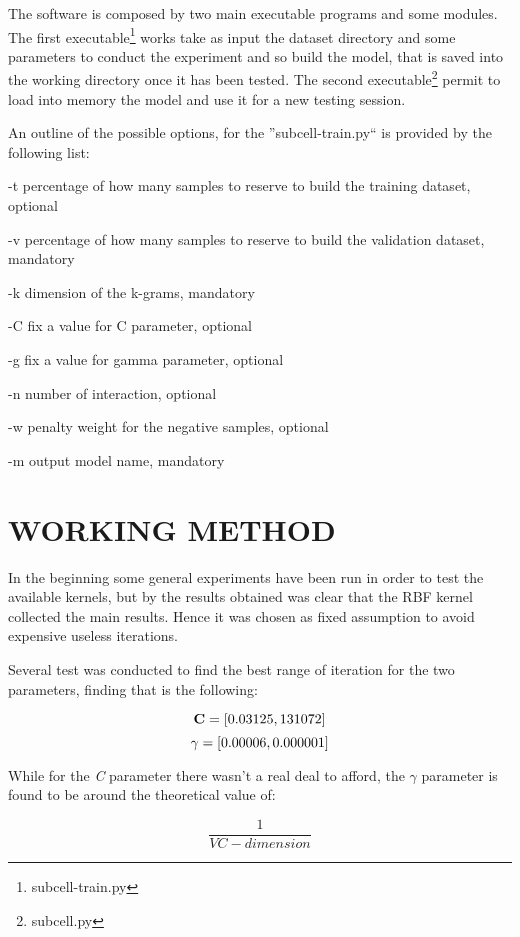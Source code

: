 \documentclass{acm_proc_article-sp-sigmod07}
\begin{document}
The software is composed by two main executable programs and some modules.
The first executable\footnote{subcell-train.py}
works take as input the dataset directory and some parameters 
to conduct the experiment and so build the model, that is saved into the working 
directory once it has been tested. The second executable\footnote{subcell.py}
permit to load into memory the model and use it for a new testing session.

An outline of the possible options, for the ''subcell-train.py`` 
is provided by the following list:
\begin{description}
\item{-t} percentage of how many samples to reserve to build the training dataset, 
optional 
\item{-v} percentage of how many samples to reserve to build the validation dataset, 
mandatory
\item{-k} dimension of the k-grams, mandatory
\item{-C} fix a value for C parameter, optional
\item{-g} fix a value for gamma parameter, optional
\item{-n} number of interaction, optional
\item{-w} penalty weight for the negative samples, optional
\item{-m} output model name, mandatory
\end{description}


\section{WORKING METHOD}
In the beginning some general experiments have been run in order to test the
available kernels, but by the results obtained was clear that the RBF kernel
collected the main results. Hence it was chosen as fixed assumption to avoid
expensive useless iterations.

Several test was conducted to find the best range of iteration for the two
parameters, finding that is the following:

$$
	\bold{C} = [0.03125, 131072]
$$
$$
 	\bold{\gamma} = [0.00006, 0.000001]
$$

While for the \emph{C} parameter there wasn't a real deal to afford, the 
$ \gamma $ parameter is found to be around the theoretical value of:

\begin{equation}
\frac{1}{VC-dimension}
\label{gamma}
\end{equation}
\end{document}
